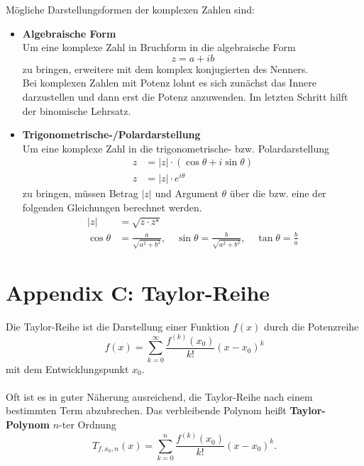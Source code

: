 \documentclass{article}
\begin{document}
Mögliche Darstellungsformen der komplexen Zahlen sind:
\begin{itemize}
	\item \textbf{Algebraische Form}\\
	Um eine komplexe Zahl in Bruchform in die algebraische Form 
	\begin{equation}
		z = a+ib
	\end{equation}	
	 zu bringen, erweitere mit dem komplex konjugierten des Nenners.\\
	Bei komplexen Zahlen mit Potenz lohnt es sich zunächst das Innere darzustellen und dann erst die Potenz anzuwenden. Im letzten Schritt hilft der binomische Lehrsatz.
	
	\item \textbf{Trigonometrische-/Polardarstellung}\\
	Um eine komplexe Zahl in die trigonometrische- bzw. Polardarstellung
		\begin{align}
			z &= |z| \cdot (\cos\theta + i\sin\theta)\\
			z &= |z| \cdot e^{i\theta}
		\end{align}
	zu bringen, müssen Betrag $|z|$ und Argument $\theta$ über die bzw. eine der folgenden Gleichungen berechnet werden.
		\begin{align}
			|z| &= \sqrt{z \cdot z^\star}\\
			\cos\theta &= \frac{a}{\sqrt{a^2 + b^2}},\quad
			\sin\theta = \frac{b}{\sqrt{a^2 + b^2}},\quad 
			\tan\theta = \frac{b}{a}
		\end{align}
\end{itemize}


\newpage


\section{Appendix C: Taylor-Reihe}
Die Taylor-Reihe ist die Darstellung einer Funktion $f(x)$ durch die Potenzreihe
	\begin{equation}
		f(x) = \sum_{k=0}^\infty \frac{f^{(k)}(x_0)}{k!}(x-x_0)^k
	\end{equation}
mit dem Entwicklungspunkt $x_0$.\\
\\
Oft ist es in guter Näherung ausreichend, die Taylor-Reihe nach einem bestimmten Term abzubrechen. Das verbleibende Polynom heißt \textbf{Taylor-Polynom} $n$-ter Ordnung
	\begin{equation}
		T_{f,x_0,n}(x) = \sum_{k=0}^n \frac{f^{(k)}(x_0)}{k!} (x-x_0)^k.
	\end{equation}
\end{document}
